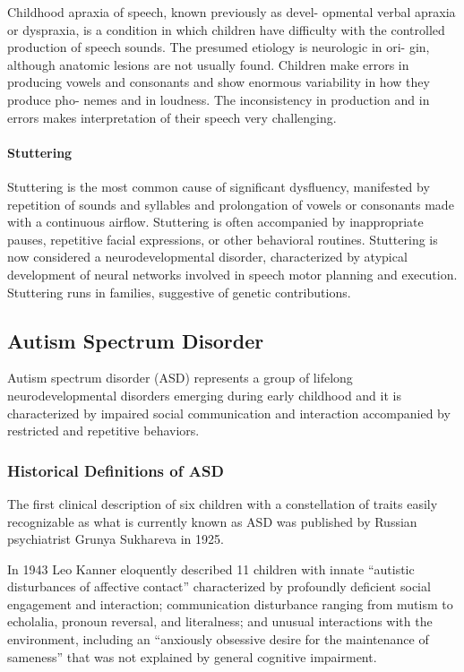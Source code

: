 Childhood apraxia of speech, known previously as devel-
opmental verbal apraxia or dyspraxia, is a condition in which
children have difficulty with the controlled production of
speech sounds. The presumed etiology is neurologic in ori-
gin, although anatomic lesions are not usually found.
Children make errors in producing vowels and consonants
and show enormous variability in how they produce pho-
nemes and in loudness. The inconsistency in production and
in errors makes interpretation of their speech very challenging. \cite{Feldman44}

\paragraph{Stuttering}
Stuttering is the most common cause of significant dysfluency, manifested by
repetition of sounds and syllables and
prolongation of vowels or consonants made with a continuous
airflow. Stuttering is often accompanied by inappropriate pauses, repetitive
facial expressions, or other behavioral routines. Stuttering is now considered
a neurodevelopmental disorder, characterized by atypical development of neural
networks involved in speech motor planning and execution.
Stuttering runs in families, suggestive of genetic contributions. \cite{Feldman44}

\subsection{Autism Spectrum Disorder}
Autism spectrum disorder (ASD) represents a group of lifelong
neurodevelopmental disorders emerging during early childhood and it is
characterized by impaired social communication and interaction accompanied by
restricted and repetitive behaviors.

\subsubsection{Historical Definitions of ASD}
The first clinical description of six children with a constellation of traits
easily recognizable as what is currently known as ASD was published by Russian
psychiatrist Grunya Sukhareva in 1925. \cite{Myers2025}

In 1943 Leo Kanner eloquently described 11 children with innate ``autistic
disturbances of affective contact'' characterized by profoundly deficient
social engagement and interaction; communication disturbance ranging from
mutism to echolalia, pronoun reversal, and literalness; and unusual
interactions with the environment, including an ``anxiously obsessive desire
for the maintenance of sameness'' that was not explained by general cognitive
impairment. \cite{Myers2025}


